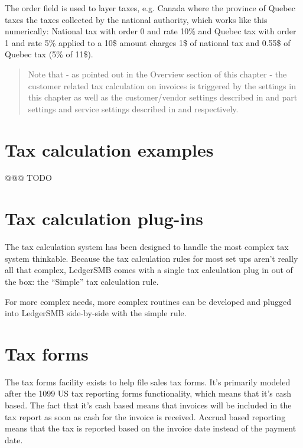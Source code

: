 The order field is used to layer taxes, e.g. Canada where the province of Quebec taxes
the taxes collected by the national authority, which works like this numerically:
National tax with order 0 and rate 10\% and Quebec tax with order 1 and rate 5\%
applied to a 10\$ amount charges 1\$ of national tax and 0.55\$ of Quebec tax (5\% of 11\$).

\begin{quote}
Note that - as pointed out in the Overview section of this chapter - the \gls{customer} related
tax calculation on invoices is triggered by the settings in this chapter as well as
the customer/vendor settings described in 
and part settings and service settings described in  and
 respectively.
\end{quote}

\section{Tax calculation examples}
\label{sec-tax-calculation-examples}

@@@ TODO

\section{Tax calculation plug-ins}
\label{sec-tax-rule-plugins}

The tax calculation system has been designed to handle the most complex tax system
thinkable. Because the tax calculation rules for most set ups aren't really all that
complex, LedgerSMB comes with a single tax calculation plug in out of the box: the
``Simple'' tax calculation rule.

For more complex needs, more complex routines can be developed and plugged into
LedgerSMB side-by-side with the simple rule.


\section{Tax forms}
\label{sec-tax-taxforms}

The tax forms facility exists to help file sales tax forms. It's primarily modeled
after the 1099 US tax reporting forms functionality, which means that it's cash based.
The fact that it's cash based means that invoices will be included in the tax report
as soon as cash for the invoice is received. Accrual based reporting means that the
tax is reported based on the invoice date instead of the payment date.

